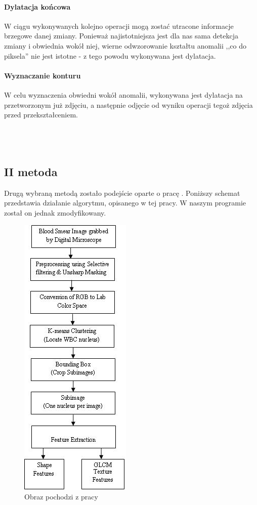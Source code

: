 \documentclass[11pt,openany]{sprawozdanie-agh}
\begin{document}
\paragraph{Dylatacja końcowa\\}
W ciągu wykonywanych kolejno operacji mogą zostać utracone informacje brzegowe danej zmiany. Ponieważ najistotniejsza jest dla nas sama detekcja zmiany i obwiednia wokół niej, wierne odwzorowanie kształtu anomalii ,,co do piksela'' nie jest istotne - z tego powodu wykonywana jest dylatacja.

\paragraph{Wyznaczanie konturu\\}
W celu wyznaczenia obwiedni wokół anomalii, wykonywana jest dylatacja na przetworzonym już zdjęciu, a następnie odjęcie od wyniku operacji tegoż zdjęcia przed przekształceniem. \\ \\ \\ \\

\subsection{II metoda}
Drugą wybraną metodą zostało podejście oparte o pracę \cite{Mohapatra:2011:ALD:1947940.1947980}. Poniższy schemat przedstawia działanie algorytmu, opisanego w tej pracy. W naszym programie został on jednak zmodyfikowany.

\begin{figure}[h!]
	\centering
		\includegraphics[scale=0.6]{schemat_Automated_Leukemia_Detection_in_Blood_Microscopic}
	\caption{Obraz pochodzi z pracy \cite{Mohapatra:2011:ALD:1947940.1947980}}
\end{figure}
\end{document}
